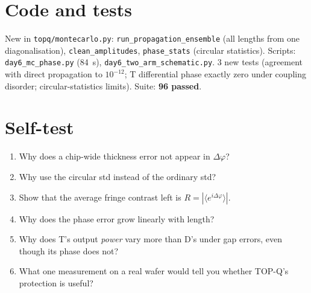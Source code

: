 \documentclass[10pt,a4paper]{article}
\begin{document}
\section{Code and tests}
New in \texttt{topq/montecarlo.py}: \texttt{run\_propagation\_ensemble} (all lengths from one diagonalisation), \texttt{clean\_amplitudes}, \texttt{phase\_stats} (circular statistics). Scripts: \texttt{day6\_mc\_phase.py} (84~s), \texttt{day6\_two\_arm\_schematic.py}. 3 new tests (agreement with direct propagation to $10^{-12}$; T differential phase exactly zero under coupling disorder; circular-statistics limits). Suite: \textbf{96 passed}.

\section{Self-test}
\begin{enumerate}[itemsep=1pt]
\item Why does a chip-wide thickness error not appear in $\Delta\varphi$?
\item Why use the circular std instead of the ordinary std?
\item Show that the average fringe contrast left is $R=|\langle e^{i\Delta\varphi}\rangle|$.
\item Why does the phase error grow linearly with length?
\item Why does T's output \emph{power} vary more than D's under gap errors, even though its phase does not?
\item What one measurement on a real wafer would tell you whether TOP-Q's protection is useful?
\end{enumerate}
\end{document}
